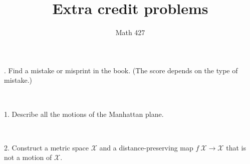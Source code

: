 \documentclass[oneside,a4paper]{article}
\begin{document}
\title{Extra credit problems}
\author{Math 427}
\date{}
\maketitle


. Find a mistake or misprint in the book.
(The score depends on the type of mistake.)

\ 

\noi %
{1.} Describe all the motions of the Manhattan plane.

\ 

\noi %
{2.} %
Construct a metric space $\mathcal X$ and a distance-preserving map $f\:\mathcal X\to \mathcal X$ that is not a motion of $\mathcal X$.
\end{document}
